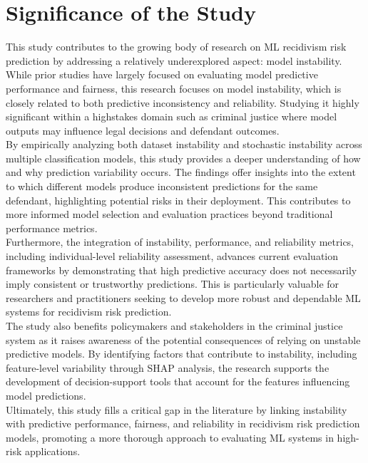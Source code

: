 \documentclass[12pt]{article}
\begin{document}
\section{Significance of the Study}
\tab This study contributes to the growing body of research on ML recidivism risk prediction by addressing a relatively underexplored aspect: model instability. While prior studies have largely focused on evaluating model predictive performance and fairness, this research focuses on model instability, which is closely related to both predictive inconsistency and reliability. Studying it highly significant within a high\-stakes domain such as criminal justice where model outputs may influence legal decisions and defendant outcomes.\\

By empirically analyzing both dataset instability and stochastic instability across multiple classification models, this study provides a deeper understanding of how and why prediction variability occurs. The findings offer insights into the extent to which different models produce inconsistent predictions for the same defendant, highlighting potential risks in their deployment. This contributes to more informed model selection and evaluation practices beyond traditional performance metrics.\\

Furthermore, the integration of instability, performance, and reliability metrics, including individual-level reliability assessment, advances current evaluation frameworks by demonstrating that high predictive accuracy does not necessarily imply consistent or trustworthy predictions. This is particularly valuable for researchers and practitioners seeking to develop more robust and dependable ML systems for recidivism risk prediction.\\

The study also benefits policymakers and stakeholders in the criminal justice system as it raises awareness of the potential consequences of relying on unstable predictive models. By identifying factors that contribute to instability, including feature-level variability through SHAP analysis, the research supports the development of decision-support tools that account for the features influencing model predictions.\\

Ultimately, this study fills a critical gap in the literature by linking instability with predictive performance, fairness, and reliability in recidivism risk prediction models, promoting a more thorough approach to evaluating ML systems in high-risk applications.
\end{document}
